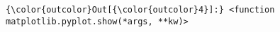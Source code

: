 \documentclass[11pt]{article}
\begin{document}
\begin{Verbatim}[commandchars=\\\{\}]
{\color{outcolor}Out[{\color{outcolor}4}]:} <function matplotlib.pyplot.show(*args, **kw)>
\end{Verbatim}
            
    \begin{center}
    \end{center}
    { \hspace*{\fill} \\}
    

    
    
    
    
\end{document}
